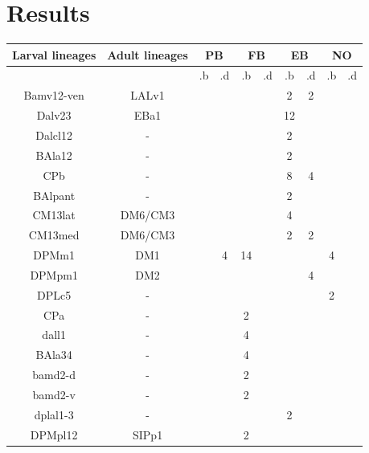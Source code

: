 \documentclass{article}
\begin{document}
\section{Results}
\begin{table}
\centering
    \begin{tabular}{|c|c|cc|cc|cc|cc|}
     \hline
              Larval lineages & Adult lineages & \multicolumn{2}{c|}{PB}& \multicolumn{2}{c|}{FB}&\multicolumn{2}{c|}{EB}&\multicolumn{2}{c|}{NO}\\
     \hline
                  & & .b &  .d & .b &  .d & .b &  .d & .b &  .d \\
         Bamv12-ven & LALv1 &    &     &    &     &  2 &   2 &    &     \\
            Dalv23 & EBa1 &    &     &    &     & 12 &     &    &     \\
           Dalcl12 & - &    &     &    &     &  2 &     &    &     \\
            BAla12 & - &    &     &    &     &  2 &     &    &     \\
               CPb & -  &    &     &    &     &  8 &   4 &    &     \\
            BAlpant & -  &    &     &    &     &  2 &     &    &     \\
            CM13lat & DM6/CM3 &    &     &    &     &  4 &     &    &     \\
            CM13med & DM6/CM3 &    &     &    &     &  2 &   2 &    &     \\
              DPMm1 & DM1&    &   4 & 14 &     &    &     &  4 &     \\
             DPMpm1 & DM2&   &     &    &     &    &   4 &    &     \\
              DPLc5 & - &    &     &    &     &    &     &  2 &     \\
                CPa & - &   &     &  2 &     &    &     &    &     \\
              dall1 & - &   &     &  4 &     &    &     &    &     \\
             BAla34 & - &   &     &  4 &     &    &     &    &     \\
            bamd2-d & - &   &     &  2 &     &    &     &    &     \\
            bamd2-v & - &   &     &  2 &     &    &     &    &     \\
           dplal1-3 & - &   &     &    &     &  2 &     &    &     \\
            DPMpl12 & SIPp1 &   &     &  2 &     &    &     &    &     \\

\end{tabular}
\end{table}
\end{document}
